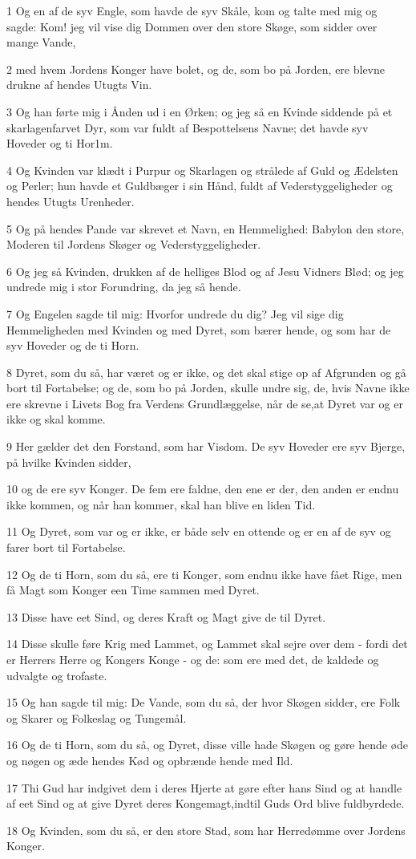 \par 1 Og en af de syv Engle, som havde de syv Skåle, kom og talte med mig og sagde: Kom! jeg vil vise dig Dommen over den store Skøge, som sidder over mange Vande,
\par 2 med hvem Jordens Konger have bolet, og de, som bo på Jorden, ere blevne drukne af hendes Utugts Vin.
\par 3 Og han førte mig i Ånden ud i en Ørken; og jeg så en Kvinde siddende på et skarlagenfarvet Dyr, som var fuldt af Bespottelsens Navne; det havde syv Hoveder og ti Hor1m.
\par 4 Og Kvinden var klædt i Purpur og Skarlagen og strålede af Guld og Ædelsten og Perler; hun havde et Guldbæger i sin Hånd, fuldt af Vederstyggeligheder og hendes Utugts Urenheder.
\par 5 Og på hendes Pande var skrevet et Navn, en Hemmelighed: Babylon den store, Moderen til Jordens Skøger og Vederstyggeligheder.
\par 6 Og jeg så Kvinden, drukken af de helliges Blod og af Jesu Vidners Blød; og jeg undrede mig i stor Forundring, da jeg så hende.
\par 7 Og Engelen sagde til mig: Hvorfor undrede du dig? Jeg vil sige dig Hemmeligheden med Kvinden og med Dyret, som bærer hende, og som har de syv Hoveder og de ti Horn.
\par 8 Dyret, som du så, har været og er ikke, og det skal stige op af Afgrunden og gå bort til Fortabelse; og de, som bo på Jorden, skulle undre sig, de, hvis Navne ikke ere skrevne i Livets Bog fra Verdens Grundlæggelse, når de se,at Dyret var og er ikke og skal komme.
\par 9 Her gælder det den Forstand, som har Visdom. De syv Hoveder ere syv Bjerge, på hvilke Kvinden sidder,
\par 10 og de ere syv Konger. De fem ere faldne, den ene er der, den anden er endnu ikke kommen, og når han kommer, skal han blive en liden Tid.
\par 11 Og Dyret, som var og er ikke, er både selv en ottende og er en af de syv og farer bort til Fortabelse.
\par 12 Og de ti Horn, som du så, ere ti Konger, som endnu ikke have fået Rige, men få Magt som Konger een Time sammen med Dyret.
\par 13 Disse have eet Sind, og deres Kraft og Magt give de til Dyret.
\par 14 Disse skulle føre Krig med Lammet, og Lammet skal sejre over dem - fordi det er Herrers Herre og Kongers Konge - og de: som ere med det, de kaldede og udvalgte og trofaste.
\par 15 Og han sagde til mig: De Vande, som du så, der hvor Skøgen sidder, ere Folk og Skarer og Folkeslag og Tungemål.
\par 16 Og de ti Horn, som du så, og Dyret, disse ville hade Skøgen og gøre hende øde og nøgen og æde hendes Kød og opbrænde hende med Ild.
\par 17 Thi Gud har indgivet dem i deres Hjerte at gøre efter hans Sind og at handle af eet Sind og at give Dyret deres Kongemagt,indtil Guds Ord blive fuldbyrdede.
\par 18 Og Kvinden, som du så, er den store Stad, som har Herredømme over Jordens Konger.

